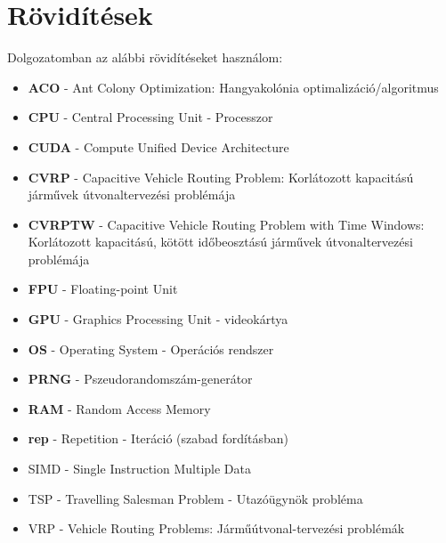 \section{Rövidítések}
Dolgozatomban az alábbi rövidítéseket használom:
\begin{itemize}
	\item \textbf{ACO} - Ant Colony Optimization: Hangyakolónia optimalizáció/algoritmus
	
	\item \textbf{CPU} - Central Processing Unit - Processzor
	\item \textbf{CUDA} - Compute Unified Device Architecture
	\item \textbf{CVRP} - Capacitive Vehicle Routing Problem: Korlátozott kapacitású járművek útvonaltervezési problémája
	\item \textbf{CVRPTW} - Capacitive Vehicle Routing Problem with Time Windows: Korlátozott kapacitású, kötött időbeosztású járművek útvonaltervezési problémája
	\item \textbf{FPU} - Floating-point Unit
	\item \textbf{GPU} - Graphics Processing Unit - videokártya
	\item \textbf{OS} - Operating System - Operációs rendszer
	\item \textbf{PRNG} - Pszeudorandomszám-generátor
	\item \textbf{RAM} - Random Access Memory
	\item \textbf{rep} - Repetition - Iteráció (szabad fordításban)
	\item SIMD - Single Instruction Multiple Data
	\item TSP - Travelling Salesman Problem - Utazóügynök probléma
	\item VRP - Vehicle Routing Problems: Járműútvonal-tervezési problémák 
\end{itemize}





